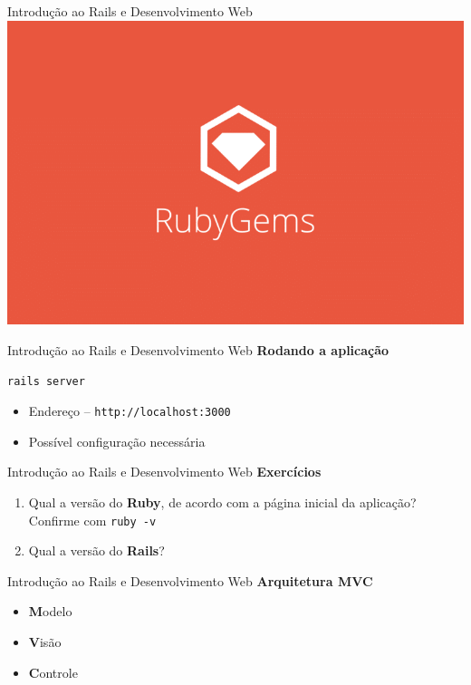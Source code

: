 \documentclass[10pt]{beamer}
\begin{document}
\begin{frame}{Introdução ao Rails e Desenvolvimento Web}
  \huge
  \includegraphics[width=\textwidth]{images/rubygems.png}
\end{frame}

\begin{frame}[fragile]{Introdução ao Rails e Desenvolvimento Web}
  \huge
  \textbf{Rodando a aplicação}
  \vfill
  \Large
  \begin{verbatim}
rails server
  \end{verbatim}
  \vfill
  \begin{itemize}
    \item Endereço -- \texttt{http://localhost:3000}
    \item [\alert{\faExclamation}] Possível configuração necessária
  \end{itemize}
\end{frame}

\begin{frame}{Introdução ao Rails e Desenvolvimento Web}
  \huge
  \textbf{Exercícios}
  \vfill
  \large
  \begin{enumerate}
    \item Qual a versão do \textbf{Ruby}, de acordo com a página inicial da aplicação? Confirme com \texttt{ruby -v}
    \item Qual a versão do \textbf{Rails}?
  \end{enumerate}
\end{frame}

\begin{frame}{Introdução ao Rails e Desenvolvimento Web}
  \huge
  \textbf{Arquitetura MVC}
  \vfill
  \begin{itemize}
    \item \textbf{M}odelo
    \item \textbf{V}isão
    \item \textbf{C}ontrole
  \end{itemize}
\end{frame}
\end{document}

